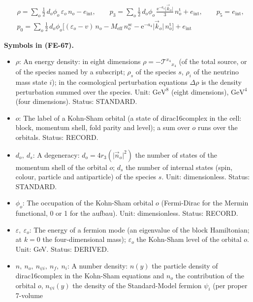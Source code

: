 \documentclass[
  10pt,
]{article}
\providecommand{\tightlist}{%
  \setlength{\itemsep}{0pt}\setlength{\parskip}{0pt}}
\begin{document}
\[
\begin{aligned}
&\rho = \sum_o\tfrac12\,d_o\phi_o\,\varepsilon_o\,n_o - e_{\mathrm{int}},\qquad
 p_3 = \sum_o\tfrac12\,d_o\phi_o\,\frac{\mathrm{e}^{-a_4}\lvert\vec k_o\rvert}{3}\,n^{\mathrm{t}}_o +
 e_{\mathrm{int}},
 \qquad p_5 = e_{\mathrm{int}},\\
&p_0 = \sum_o\tfrac12\,d_o\phi_o\Big[(\varepsilon_o - v)\,n_o - M_{\mathrm{eff}}\,n^{\mathrm{sc}}_o
 - \mathrm{e}^{-a_4}\lvert\vec k_o\rvert\,n^{\mathrm{t}}_o\Big] + e_{\mathrm{int}}
\end{aligned} \tag{FE-67}
\]

\textbf{Symbols in (FE-67).}

\begin{itemize}
\tightlist
\item
  \(\rho\): An energy density: in eight dimensions
  \(\rho = -\mathcal{T}^{x_4}{}_{x_4}\) (of the total source, or of the
  species named by a subscript; \(\rho_s\) of the species \(s\),
  \(\rho_i\) of the neutrino mass state \(i\)); in the cosmological
  perturbation equations \(\Delta\rho\) is the density perturbation
  summed over the species. Unit: \(\mathrm{GeV}^{8}\) (eight
  dimensions), \(\mathrm{GeV}^{4}\) (four dimensions). Status: STANDARD.
\item
  \(o\): The label of a Kohn-Sham orbital (a state of dirac16complex in
  the cell: block, momentum shell, fold parity and level); a sum over
  \(o\) runs over the orbitals. Status: RECORD.
\item
  \(d_o,\ d_s\): A degeneracy: \(d_o = 4r_3(\lvert\vec n_o\rvert^2)\)
  the number of states of the momentum shell of the orbital \(o\);
  \(d_s\) the number of internal states (spin, colour, particle and
  antiparticle) of the species \(s\). Unit: dimensionless. Status:
  STANDARD.
\item
  \(\phi_o\): The occupation of the Kohn-Sham orbital \(o\) (Fermi-Dirac
  for the Mermin functional, 0 or 1 for the aufbau). Unit:
  dimensionless. Status: RECORD.
\item
  \(\varepsilon,\ \varepsilon_o\): The energy of a fermion mode (an
  eigenvalue of the block Hamiltonian; at \(k = 0\) the four-dimensional
  mass); \(\varepsilon_o\) the Kohn-Sham level of the orbital \(o\).
  Unit: GeV. Status: DERIVED.
\item
  \(n,\ n_o,\ n_{\psi i},\ n_f,\ n_i\): A number density: \(n(y)\) the
  particle density of dirac16complex in the Kohn-Sham equations and
  \(n_o\) the contribution of the orbital \(o\), \(n_{\psi i}(y)\) the
  density of the Standard-Model fermion \(\psi_i\) (per proper 7-volume

\end{itemize}
\end{document}
